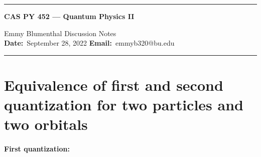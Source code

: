 \documentclass[10pt]{article}
\newcommand{\1}{\mathbf 1}
\begin{document}
\begin{center}
	\hrule
	\vspace{.4cm}
	{\textbf { \large CAS PY 452 --- Quantum Physics II}}
\end{center}
Emmy Blumenthal \hspace{\fill} \hspace{\fill}  \textbf{} Discussion Notes\  \\
\textbf{Date:}\  September 28, 2022   \hspace{\fill} \textbf{Email:}\ emmyb320@bu.edu

\vspace{.4cm}
\hrule


\section*{Equivalence of first and second quantization for two particles and two orbitals}
\paragraph{First quantization:}
\end{document}
